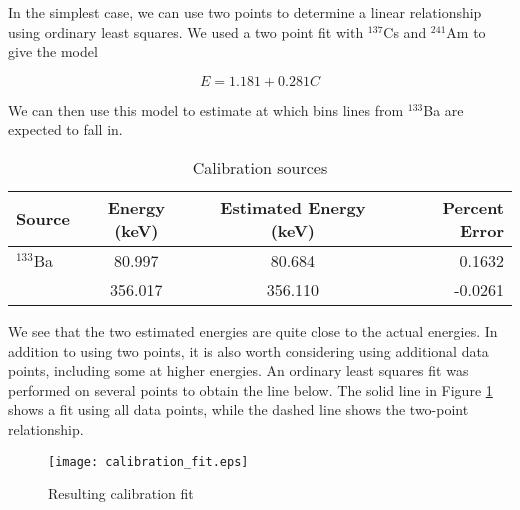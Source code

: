 In the simplest case, we can use two points to determine a linear relationship
using ordinary least squares. We used a two point fit with $^{137}$Cs and
$^{241}$Am to give the model

\begin{equation}
E = 1.181 + 0.281 C
\end{equation}

We can then use this model to estimate at which bins lines from $^{133}$Ba are
expected to fall in.

\begin{table}[!t]
\renewcommand{\arraystretch}{1.3}
\caption{Calibration sources}
\label{tab:sources}
\centering
\begin{tabular}{l|c|c|r}
\hline
\bfseries Source & \bfseries Energy (keV) & \bfseries Estimated Energy (keV) & \bfseries Percent Error\\
\hline\hline
      $^{133}$Ba    &  80.997    & 80.684   &  0.1632 \\
                    &  356.017   & 356.110  &  -0.0261 \\
\hline
\end{tabular}
\end{table}

We see that the two estimated energies are quite close to the actual energies. In addition to using two points,
it is also worth considering using additional data points, including some at higher energies. An ordinary least
squares fit was performed on several points to obtain the line below. The solid line in Figure \ref{fig:fit} shows a fit using all data points,
while the dashed line shows the two-point relationship.

\begin{figure}[!t]
\centering
\texttt{[image: calibration\_fit.eps]}
\caption{Resulting calibration fit}
\label{fig:fit}
\end{figure}
